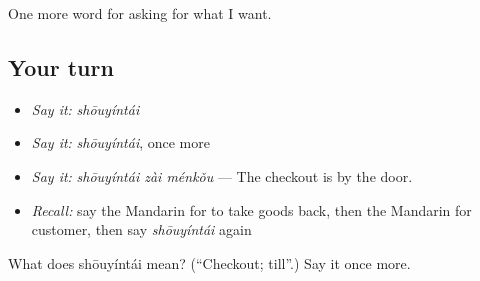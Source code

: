 \begin{grammarlens}[title={What you've built}]
One more word for asking for what I want.
\end{grammarlens}

\subsection*{Your turn}
\begin{itemize}
\raggedright
  \item \emph{Say it:} \emph{shōuyíntái}
  \item \emph{Say it:} \emph{shōuyíntái}, once more
  \item \emph{Say it:} \emph{shōuyíntái zài ménkǒu} — The checkout is by the door.
  \item \emph{Recall:} say the Mandarin for to take goods back, then the Mandarin for customer, then say \emph{shōuyíntái} again
\end{itemize}

\begin{tcolorbox}[breakable,colback=teal!4,colframe=teal!35!black,title={Before you move on}]
What does shōuyíntái mean? (\textquotedblleft{}Checkout; till\textquotedblright{}.) Say it once more.
\end{tcolorbox}

